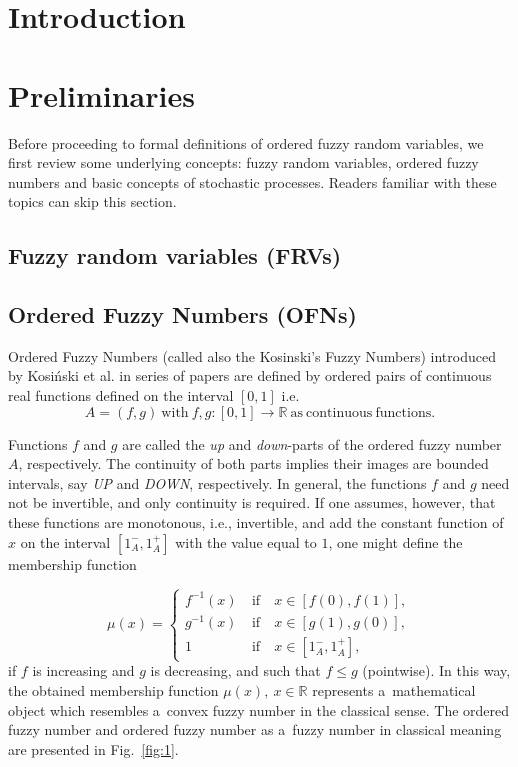 \documentclass[review]{elsarticle}
\begin{document}
\section{Introduction}



\section{Preliminaries}
Before proceeding to formal definitions of ordered fuzzy random variables, we first review some underlying concepts: fuzzy random variables, ordered fuzzy numbers and basic concepts of stochastic processes. Readers familiar with these topics can skip this section.

\subsection{Fuzzy random variables (FRVs)}


\subsection{Ordered Fuzzy Numbers (OFNs)}
Ordered Fuzzy Numbers (called also the Kosinski's Fuzzy Numbers) introduced by Kosi\'nski et al. in series of papers \cite{kos2002,kos2003a,kos2003b,kos2004,kos2006} are defined by ordered pairs of continuous real functions defined on the interval $[0,1]$ i.e.
\begin{equation}
A=(f,g)\ \mathrm{with}\ f,g\colon[0,1]\to\mathbb{R}\ \mathrm{as\ continuous\ functions}. 
\end{equation} 

Functions $f$ and $g$ are called the \emph{up} and \emph{down}-parts of the ordered fuzzy number $A$, respectively. The continuity of both parts implies their images are bounded intervals, say \emph{UP} and \emph{DOWN}, respectively. In general, the functions $f$ and $g$ need not be invertible, and only continuity is required. If one assumes, however, that these functions are monotonous, i.e., invertible, and add the constant function of $x$ on the interval $[1_A^-,1_A^+]$ with the value equal to $1$, one might define the membership function

\begin{equation}
\label{eq:1}
\mu(x)=\left\{
\begin{array}{ccl}
f^{-1}(x) &\ \mathrm{ if }\ & x\in[f(0),f(1)],\\
g^{-1}(x) &\ \mathrm{ if }\ & x\in[g(1),g(0)],\\
1&\ \mathrm{ if }\ &x\in[1_A^-,1_A^+],
\end{array}
\right.
\end{equation}
if $f$ is increasing and $g$ is decreasing, and such that $f\leq g$ (pointwise). In this way, the obtained membership function $\mu(x),\ x\in\mathbb{R}$ represents a~mathematical object which resembles a~convex fuzzy number in the classical sense. The ordered fuzzy number and ordered fuzzy number as a~fuzzy number in classical meaning are presented in Fig.~\ref{fig:1}.
\end{document}
